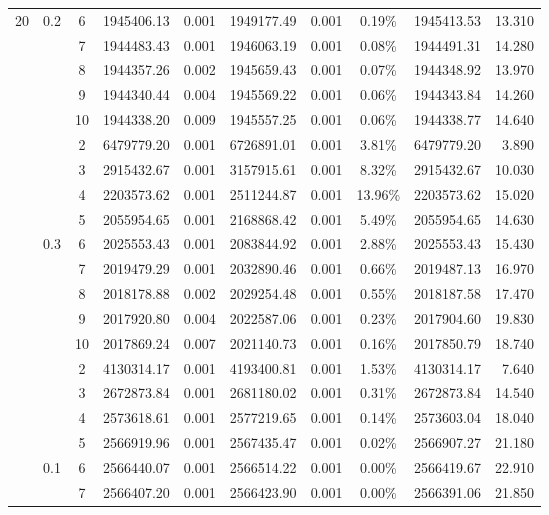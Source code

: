 {\begin{longtable}{cccrcrrcrr}
	  20    & 0.2   & 6     & 1945406.13 & 0.001 & 1949177.49 & 0.001 & 0.19\% & 1945413.53 & 13.310 \\
			&       & 7     & 1944483.43 & 0.001 & 1946063.19 & 0.001 & 0.08\% & 1944491.31 & 14.280 \\
			&       & 8     & 1944357.26 & 0.002 & 1945659.43 & 0.001 & 0.07\% & 1944348.92 & 13.970 \\
			&       & 9     & 1944340.44 & 0.004 & 1945569.22 & 0.001 & 0.06\% & 1944343.84 & 14.260 \\
			&       & 10    & 1944338.20 & 0.009 & 1945557.25 & 0.001 & 0.06\% & 1944338.77 & 14.640 \\
			&       & 2     & 6479779.20 & 0.001 & 6726891.01 & 0.001 & 3.81\% & 6479779.20 & 3.890 \\
			&       & 3     & 2915432.67 & 0.001 & 3157915.61 & 0.001 & 8.32\% & 2915432.67 & 10.030 \\
			&       & 4     & 2203573.62 & 0.001 & 2511244.87 & 0.001 & 13.96\% & 2203573.62 & 15.020 \\
			&       & 5     & 2055954.65 & 0.001 & 2168868.42 & 0.001 & 5.49\% & 2055954.65 & 14.630 \\
			& 0.3   & 6     & 2025553.43 & 0.001 & 2083844.92 & 0.001 & 2.88\% & 2025553.43 & 15.430 \\
			&       & 7     & 2019479.29 & 0.001 & 2032890.46 & 0.001 & 0.66\% & 2019487.13 & 16.970 \\
			&       & 8     & 2018178.88 & 0.002 & 2029254.48 & 0.001 & 0.55\% & 2018187.58 & 17.470 \\
			&       & 9     & 2017920.80 & 0.004 & 2022587.06 & 0.001 & 0.23\% & 2017904.60 & 19.830 \\
			&       & 10    & 2017869.24 & 0.007 & 2021140.73 & 0.001 & 0.16\% & 2017850.79 & 18.740 \\
			\cmidrule(r){3-10}
			&       & 2     & 4130314.17 & 0.001 & 4193400.81 & 0.001 & 1.53\% & 4130314.17 & 7.640 \\
			&       & 3     & 2672873.84 & 0.001 & 2681180.02 & 0.001 & 0.31\% & 2672873.84 & 14.540 \\
			&       & 4     & 2573618.61 & 0.001 & 2577219.65 & 0.001 & 0.14\% & 2573603.04 & 18.040 \\
			&       & 5     & 2566919.96 & 0.001 & 2567435.47 & 0.001 & 0.02\% & 2566907.27 & 21.180 \\
			& 0.1   & 6     & 2566440.07 & 0.001 & 2566514.22 & 0.001 & 0.00\% & 2566419.67 & 22.910 \\
			&       & 7     & 2566407.20 & 0.001 & 2566423.90 & 0.001 & 0.00\% & 2566391.06 & 21.850 \\

\end{longtable}}
